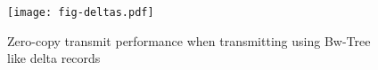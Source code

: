 \begin{figure}[H]
\texttt{[image: fig-deltas.pdf]}
\caption{Zero-copy transmit performance when transmitting using 
Bw-Tree like delta records}
\label{fig:deltas}
\end{figure}
